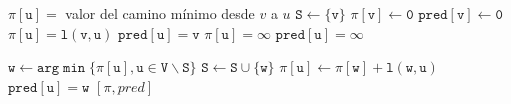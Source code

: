 \begin{algorithmic}
  \State $\mathtt{\pi[u] =}$ valor del camino mínimo desde $v$ a $u$
  \State $\mathtt{S \gets \{v\}}$
  \State $\mathtt{\pi[v] \gets 0}$
  \State $\mathtt{pred[v] \gets 0}$
  \State $\mathtt{\pi[u] = l(v, u)}$
  \State $\mathtt{pred[u] = v}$
  \Else
  \State $\mathtt{\pi[u] = \infty}$
  \State $\mathtt{pred[u] = \infty}$
  \EndIf
  \EndFor

  \State $\mathtt{w\gets arg\min\{\pi[u], u\in V\backslash S\}}$
  \State $\mathtt{S \gets S\cup\{w\}}$
  \State $\mathtt{\pi[u] \gets \pi[w] + l(w,u)}$
  \State $\mathtt{pred[u] = w}$
  \EndIf
  \EndFor
  \EndWhile
  \State\Return$[\mathtt{\pi}, pred]$
  \EndProcedure
\end{algorithmic}
